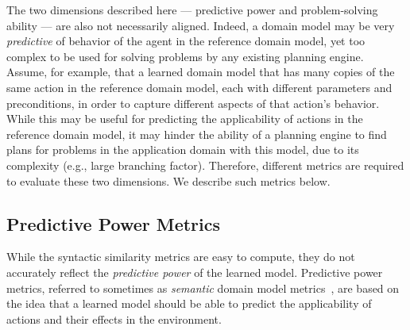 \documentclass{article}
\theoremstyle{definition}
\theoremstyle{remark}
\newif\ifaddcomments
\newcommand{\roni}[1]{\ifaddcomments{\textcolor{red}{[Roni: #1]}}\fi}
\newcommand{\cm}[1]{\ifaddcomments{\textcolor{olive}{[Christian: #1]}}\fi}
\begin{document}
The two dimensions described here --- predictive power and problem-solving ability --- are also not necessarily aligned. Indeed, a domain model may be very \emph{predictive} of behavior of the agent in the reference domain model, yet too complex to be used for solving problems by any existing planning engine.
Assume, for example, that a learned domain model that has many copies of the same action in the reference domain model, each with different parameters and preconditions, in order to capture different aspects of that action's behavior. 
While this may be useful for predicting the applicability of actions in the reference domain model, 
it may hinder the ability of a planning engine to find plans for problems in the application domain with this model, due to its complexity (e.g., large branching factor). 
Therefore, different metrics are required to evaluate these two dimensions. We describe such metrics below. 



\subsection{Predictive Power Metrics}
\label{sec:predictiveness-metrics}
While the syntactic similarity metrics are easy to compute, they do not accurately reflect the \emph{predictive power} of the learned model. 
Predictive power metrics, referred to sometimes as \emph{semantic} domain model metrics~\citep{aineto2019learning,mordoch2024safe,le2024learning}, are based on the idea that a learned model should be able to predict the applicability of actions and their effects in the environment. 

\cm{Up until this point, I thought it was headed towards the predictive power of explaining the trajectory data. Given that it's about action applicability, this needs to be clarified much earlier on (e.g., intro). Also means that we don't have a notion of how well the learned model predicts the trajectories?}
\end{document}
